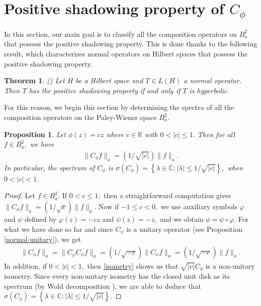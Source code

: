 \documentclass[11pt]{amsart}%
\numberwithin{equation}{section}
\theoremstyle{plain}
\newtheorem{prop}[thm]{Proposition}
\newtheorem{teo}{Theorem}
\theoremstyle{definition}
\theoremstyle{definition}
\begin{document}
\section{Positive shadowing property of \texorpdfstring{$C_{\phi}$}{}}\label{s2}
In this section, our main goal is to classify all the composition operators on $B^2_a$ that possess the positive shadowing property. This is done thanks to the following result, which characterizes normal operators on Hilbert spaces that possess the positive shadowing property.

\begin{teo}\label{normal-hyperbolic}\normalfont (\cite[Theorem 30]{Bernardes}) Let $H$ be a Hilbert space and $T\in L(H)$ a normal operator. Then $T$ has the positive shadowing property if and only if $T$ is hyperbolic.
\end{teo}

For this reason, we begin this section by determining the spectra of  all the composition operators on the Paley-Wiener space $B^2_a.$

\begin{prop}\label{first estimates} Let $\phi(z)=cz$ where $c\in \mathbb{R}$ with $0<|c|\leq 1.$ Then  for all $f\in B^2_a,$ we have 
\begin{align}\label{isometry}
\|C_{\phi}f\|_a=(1/\sqrt{|c|})\|f\|_a.
\end{align}
In particular, the spectrum of $C_{\phi}$ is $\sigma(C_{\phi})=\left\{\lambda\in \mathbb{C}: |\lambda|\leq 1/\sqrt{|c|}\right\},$ when $0<|c|<1.$
\end{prop}
\begin{proof} Let $f\in B^2_a.$  If $0<c\leq1,$ then a  straightforward computation gives $\|C_{\phi}f\|_a=(1/\sqrt{c})\|f\|_a.$ Now if $-1\leq c<0,$ we use auxiliary symbols $\varphi$ and $\psi$ defined by $\varphi(z)=-cz$ and $\psi(z)=-z,$ and we obtain $\phi=\psi\circ \varphi.$  For what we have done so far and since $C_{\psi}$ is a unitary operator (see Proposition \ref{normal-unitary}), we get
\begin{align*}
\|C_{\phi}f\|_{a}=\|C_{\varphi}C_{\psi}f\|_{a}=(1/\sqrt{-c})\|C_{\psi}f\|_{a}=(1/\sqrt{-c})\|f\|_{a}.
\end{align*}
 In addition, if $0<|c|<1,$ then \eqref{isometry} shows us that $\sqrt{|c|}C_{\phi}$ is a non-unitary isometry. Since every non-unitary isometry has the closed unit disk as its spectrum (by Wold decomposition \cite{Neumann}), we are able to deduce that $\sigma(C_{\phi})=\left\{\lambda\in \mathbb{C}:|\lambda|\leq 1/\sqrt{|c|}\right\}.$
\end{proof}
\end{document}
